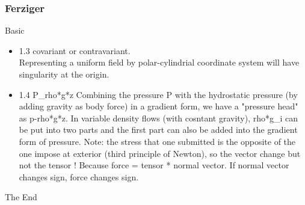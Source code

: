 \documentclass{beamer}
\begin{document}
\begin{frame}
\frametitle{Ferziger}

\begin{block}{Basic}
\begin{itemize}
\item 1.3 covariant or contravariant. \\
Representing a uniform field by polar-cylindrial coordinate system will have singularity at the origin.

\item 1.4 P\_rho*g*z
Combining the pressure P with the hydrostatic pressure (by adding gravity as body force) in a gradient form, we have a "pressure head" as p-rho*g*z.
In variable density flows (with cosntant gravity), rho*g\_i can be put into two parts and the first part can also be added into the gradient form of pressure.
Note: the stress that one submitted is the opposite of the one impose at exterior (third principle of Newton), so the vector change but not the tensor ! Because force = tensor * normal vector. If normal vector changes sign, force changes sign.
\end{itemize}
\end{block}

\end{frame}



\begin{frame}
\Huge{\centerline{The End}}
\end{frame}

\end{document}
